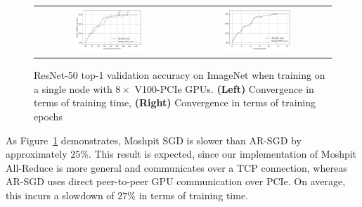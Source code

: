 \begin{figure}[h]
    \centering
    \begin{tabular}{cc}
    \hspace{-10pt}
        \includegraphics[width=0.5\textwidth]{resources/resnet50_local.pdf} &
        \includegraphics[width=0.5\textwidth]{resources/resnet50_local_epochs.pdf}
    \end{tabular}
    \caption{
    ResNet-50 top-1 validation accuracy on ImageNet when training on a single node with $8{\times}$ V100-PCIe GPUs.
    \textbf{(Left)} Convergence in terms of training time, \textbf{(Right)} Convergence in terms of training epochs}
    \label{fig:resnet_local}\vspace{-8pt}
\end{figure}

As Figure~\ref{fig:resnet_local} demonstrates, Moshpit SGD is slower than AR-SGD by approximately $25\%$. This result is expected, since our implementation of Moshpit All-Reduce is more general and communicates over a TCP connection, whereas AR-SGD uses direct peer-to-peer GPU communication over PCIe. On average, this incurs a slowdown of $27\%$ in terms of training time.